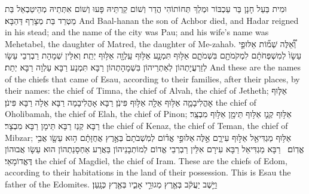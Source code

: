 {וּמִית בַּעַל חָנָן בַּר עַכְבּוֹר וּמְלַךְ תְּחוֹתוֹהִי הֲדַר וְשׁוֹם קַרְתֵּיהּ פָּעוּ וְשׁוֹם אִתְּתֵיהּ מְהֵיטַבְאֵל בַּת מַטְרֵד בַּת מְצָרֵף דַּהְבָּא׃}
{And Baal-hanan the son of Achbor died, and Hadar reigned in his stead; and the name of the city was Pau; and his wife’s name was Mehetabel, the daughter of Matred, the daughter of Me-zahab.}{}
{וְ֠אֵ֠לֶּה שְׁמ֞וֹת אַלּוּפֵ֤י עֵשָׂו֙ לְמִשְׁפְּחֹתָ֔ם לִמְקֹמֹתָ֖ם בִּשְׁמֹתָ֑ם אַלּ֥וּף תִּמְנָ֛ע אַלּ֥וּף עַֽלְוָ֖ה אַלּ֥וּף יְתֵֽת׃}
{וְאִלֵּין שְׁמָהָת רַבְרְבֵי עֵשָׂו לְזַרְעֲיָתְהוֹן לְאַתְרֵיהוֹן בִּשְׁמָהָתְהוֹן רַבָּא תִּמְנָע רַבָּא עַלְוָה רַבָּא יְתֵת׃}
{And these are the names of the chiefs that came of Esau, according to their families, after their places, by their names: the chief of Timna, the chief of Alvah, the chief of Jetheth;}{}
{אַלּ֧וּף אׇהֳלִיבָמָ֛ה אַלּ֥וּף אֵלָ֖ה אַלּ֥וּף פִּינֹֽן׃}
{רַבָּא אָהֳלִיבָמָה רַבָּא אֵלָה רַבָּא פִּינֹן׃}
{the chief of Oholibamah, the chief of Elah, the chief of Pinon;}{}
{אַלּ֥וּף קְנַ֛ז אַלּ֥וּף תֵּימָ֖ן אַלּ֥וּף מִבְצָֽר׃}
{רַבָּא קְנַז רַבָּא תֵּימָן רַבָּא מִבְצָר׃}
{the chief of Kenaz, the chief of Teman, the chief of Mibzar;}{}
{אַלּ֥וּף מַגְדִּיאֵ֖ל אַלּ֣וּף עִירָ֑ם אֵ֣לֶּה \legarmeh  אַלּוּפֵ֣י אֱד֗וֹם לְמֹֽשְׁבֹתָם֙ בְּאֶ֣רֶץ אֲחֻזָּתָ֔ם ה֥וּא עֵשָׂ֖ו אֲבִ֥י אֱדֽוֹם׃ \petucha }
{רַבָּא מַגְדִּיאֵל רַבָּא עִירָם אִלֵּין רַבְרְבֵי אֱדוֹם לְמוֹתְבָנֵיהוֹן בַּאֲרַע אַחְסָנַתְהוֹן הוּא עֵשָׂו אֲבוּהוֹן דֶּאֱדוֹמָאֵי׃}
{the chief of Magdiel, the chief of Iram. These are the chiefs of Edom, according to their habitations in the land of their possession. This is Esau the father of the Edomites.}{}
\newperek
{}
{וַיֵּ֣שֶׁב יַעֲקֹ֔ב בְּאֶ֖רֶץ מְגוּרֵ֣י אָבִ֑יו בְּאֶ֖רֶץ כְּנָֽעַן׃}
